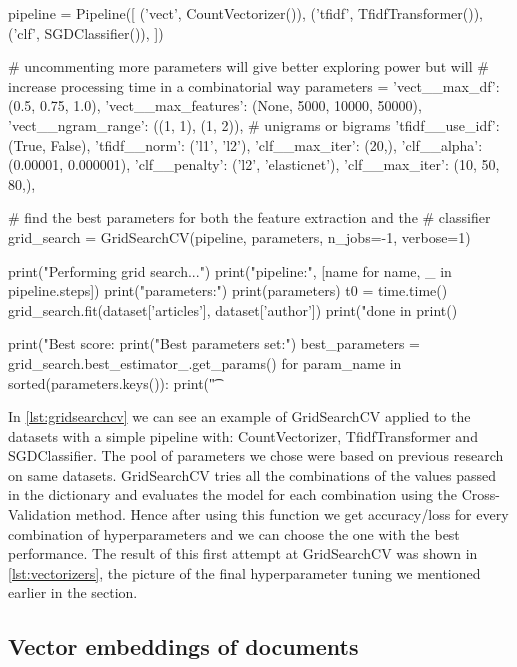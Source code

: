\begin{lstlisting}[frame=none,caption={GridSearchCV with BOW, TFIDF and SGD.},captionpos=b,label=lst:gridsearchcv]
\end{lstlisting}
\begin{python}	
	pipeline = Pipeline([
	('vect', CountVectorizer()),
	('tfidf', TfidfTransformer()),
	('clf', SGDClassifier()),
	])
	
	# uncommenting more parameters will give better exploring power but will
	# increase processing time in a combinatorial way
	parameters = {
		'vect__max_df': (0.5, 0.75, 1.0),
		'vect__max_features': (None, 5000, 10000, 50000),
		'vect__ngram_range': ((1, 1), (1, 2)),  # unigrams or bigrams
		'tfidf__use_idf': (True, False),
		'tfidf__norm': ('l1', 'l2'),
		'clf__max_iter': (20,),
		'clf__alpha': (0.00001, 0.000001),
		'clf__penalty': ('l2', 'elasticnet'),
		'clf__max_iter': (10, 50, 80,),
	}
	
	# find the best parameters for both the feature extraction and the
	# classifier
	grid_search = GridSearchCV(pipeline, parameters, n_jobs=-1, verbose=1)
	
	print("Performing grid search...")
	print("pipeline:", [name for name, _ in pipeline.steps])
	print("parameters:")
	print(parameters)
	t0 = time.time()
	grid_search.fit(dataset['articles'], dataset['author'])
	print("done in %
	print()
	
	print("Best score: %
	print("Best parameters set:")
	best_parameters = grid_search.best_estimator_.get_params()
	for param_name in sorted(parameters.keys()):
	print("\t%
\end{python}

 In \autoref{lst:gridsearchcv} we can see an example of GridSearchCV applied to the datasets with a simple pipeline with: CountVectorizer, TfidfTransformer and SGDClassifier. The pool of parameters we chose were based on previous research on same datasets.
GridSearchCV tries all the combinations of the values passed in the dictionary and evaluates the model for each combination using the Cross-Validation method. Hence after using this function we get accuracy/loss for every combination of hyperparameters and we can choose the one with the best performance. The result of this first attempt at GridSearchCV was shown in \autoref{lst:vectorizers}, the picture of the final hyperparameter tuning we mentioned earlier in the section.

\subsection{Vector embeddings of documents}

